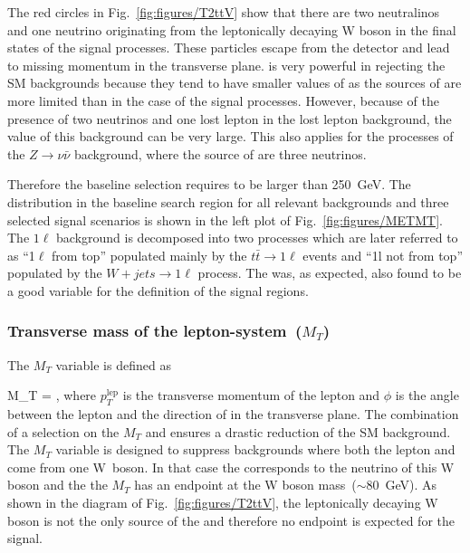 The red circles in Fig.~\ref{fig:figures/T2ttV} show that there are two neutralinos and one neutrino originating from the leptonically decaying W boson  in the final states of the signal processes. These particles escape from the detector and lead to missing momentum in the transverse plane. \MET is very powerful in rejecting the SM backgrounds because they tend to have smaller values of \MET as the sources of \MET are more limited than in  the case of the signal processes. However, because of the presence of two neutrinos and one lost lepton in the lost lepton background, the \MET value of this background can be very large. This also applies for the processes of the $Z \to \nu \bar{\nu}$ background, where the source of \MET are three neutrinos.

Therefore the baseline selection requires \MET to be larger than 250~GeV. The \MET distribution in the baseline search region for all relevant backgrounds and three selected signal scenarios is shown in the left plot of Fig.~\ref{fig:figures/METMT}. The $1\ell$ background is decomposed into two processes which are later referred to as ``1$\ell$ from top'' populated mainly by the $t \bar{t} \to 1\ell$ events and ``1l not from top'' populated by the $W+jets \to 1\ell$  process. The \MET was, as expected, also found to be a good variable for the definition of the signal regions.


\subsubsection{Transverse mass of the lepton-\MET system~($M_{T}$)}

The $M_{T}$ variable is defined as

{
 M_{T} =  ,
}
where $p_{T}^{\mathrm{lep}}$ is the transverse momentum of the lepton and $\phi$ is the angle between the lepton and the direction of \MET in the transverse plane. The combination of a selection on the $M_{T}$ and \MET ensures a drastic reduction of the SM background. The $M_{T}$ variable is  designed to suppress backgrounds where both the lepton and \MET come from one W~boson. In that case the \MET corresponds to the neutrino of this W boson and the the $M_{T}$ has an endpoint at the W boson mass~($\sim$80~GeV). As shown in the diagram of Fig.~\ref{fig:figures/T2ttV}, the leptonically decaying W boson is not the only source of the \MET and therefore no endpoint is expected for the signal.


